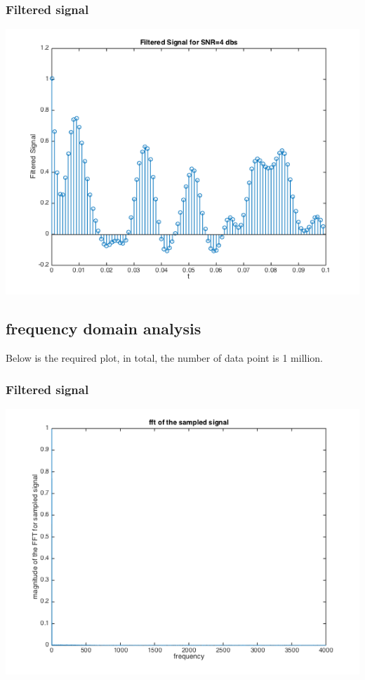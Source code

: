 \documentclass[11pt]{scrartcl}
\begin{document}
\subsubsection{Filtered signal}
\begin{minipage}[t]{\linewidth}
{
\includegraphics[scale = 0.6]{filtered_signal.png}
}
\end{minipage}
\medskip


\subsection{frequency domain analysis }
Below is the required plot, in total, the number of data point is 1 million.
\subsubsection{Filtered signal}
\begin{minipage}[t]{\linewidth}
{
\includegraphics[scale = 0.6]{sampled_signal_fft.png}
}
\end{minipage}
\medskip
\end{document}
